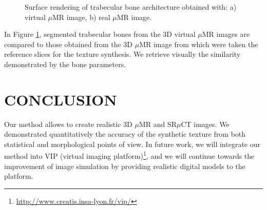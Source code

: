 \documentclass{article}
\begin{document}
\begin{figure}
 \vspace{-0.2cm}
 \centering 
{}
 \caption{Surface rendering of trabecular bone architecture obtained with: a) virtual $\mu$MR image, b) real $\mu$MR image.}
 \label{fig:bone_surface_rendering}
 \vspace{-0.1cm}
\end{figure}
%
In Figure \ref{fig:bone_surface_rendering}, segmented trabecular bones from the 3D virtual $\mu$MR images are compared to those obtained from the 3D $\mu$MR image 
from which were taken the reference slices for the texture synthesis. We retrieve visually the similarity demonstrated by the bone parameters.

\section{\uppercase{Conclusion}}
\label{sec:Conclusions}
%
Our method allows to create realistic 3D $\mu$MR and SR$\mu$CT images. We demonstrated quantitatively the accuracy of 
the synthetic texture from both statistical and morphological points of view. 
In future work, we will integrate our method into VIP (virtual imaging platform)\footnote{\url{http://www.creatis.insa-lyon.fr/vip/}}, 
and we will continue towards the improvement of image simulation by providing realistic digital models to the platform.



\end{document}
